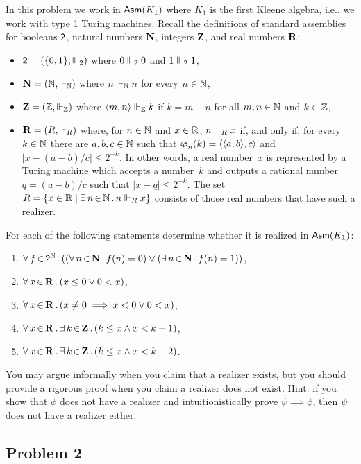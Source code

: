 \documentclass[a4paper,11pt]{article}
\begin{document}
In this problem we work in $\mathsf{Asm}(K_1)$ where $K_1$ is the first Kleene
algebra, i.e., we work with type 1 Turing machines. Recall the
definitions of standard assemblies for booleans $\mathsf{2}$, natural
numbers $\mathbf{N}$, integers $\mathbf{Z}$, and real numbers $\mathbf{R}$:
%
\begin{itemize}
\item $\mathsf{2} = (\{0,1\}, {\Vdash_2})$ where $0 \Vdash_2 0$ and
  $1 \Vdash_2 1$,
\item $\mathbf{N} = (\mathbb{N}, {\Vdash_{\mathbb{N}}})$ where $n \Vdash_{\mathbb{N}} n$ for every $n
  \in \mathbb{N}$,
\item $\mathbf{Z} = (\mathbb{Z}, {\Vdash_{\mathbb{Z}}})$ where $\langle m,n \rangle \Vdash_{\mathbb{Z}} k$ if $k
  = m - n$ for all $m, n \in \mathbb{N}$ and $k \in \mathbb{Z}$,
\item $\mathbf{R} = (R, {\Vdash_R})$ where, for $n \in \mathbb{N}$ and $x \in \mathbb{R}$,
  $n \Vdash_R x$ if, and only if, for every $k \in \mathbb{N}$ there are $a, b,
  c \in \mathbb{N}$ such that $\text{\boldmath{$\varphi$}}_{n}(k) = \langle \langle a, b \rangle, c \rangle$ and $|x -
  (a - b)/c| \leq 2^{-k}$. In other words, a real number~$x$ is
  represented by a Turing machine which accepts a number~$k$ and
  outputs a rational number $q = (a-b)/c$ such that $|x - q| \leq
  2^{-k}$. The set $R = \{x \in \mathbb{R} \mid \exists\, n \,{\in}\, \mathbb{N}\,.\,n \Vdash_R
      x\}$ consists of those real numbers that have such a realizer.
\end{itemize}
%
For each of the following statements determine whether it is realized
in $\mathsf{Asm}(K_1)$:
%
\begin{enumerate}
\item $\forall\, f \,{\in}\, \mathsf{2}^{\mathbb{N}}\,.\left((\forall\, n \,{\in}\, \mathbf{N}\,.\,f(n)=0) \lor
    (\exists\, n \,{\in}\, \mathbf{N}\,.\,f(n) = 1)\right)$,
\item $\forall\, x \,{\in}\, \mathbf{R}\,.\left(x \leq 0 \lor 0 < x\right)$,
\item $\forall\, x \,{\in}\, \mathbf{R}\,.\left(x \neq 0 \implies x < 0 \lor 0 < x\right)$,
\item $\forall\, x \,{\in}\, \mathbf{R}\,.\,\exists\, k \,{\in}\, \mathbf{Z}\,.\left(k \leq x \land x < k + 1\right)$,
\item $\forall\, x \,{\in}\, \mathbf{R}\,.\,\exists\, k \,{\in}\, \mathbf{Z}\,.\left(k \leq x \land x < k + 2\right)$.
\end{enumerate}
%
You may argue informally when you claim that a realizer exists, but
you should provide a rigorous proof when you claim a realizer does not
exist. Hint: if you show that $\phi$ does not have a realizer and
intuitionistically prove $\psi \implies \phi$, then $\psi$ does not
have a realizer either.

\subsection*{Problem 2}
\end{document}

